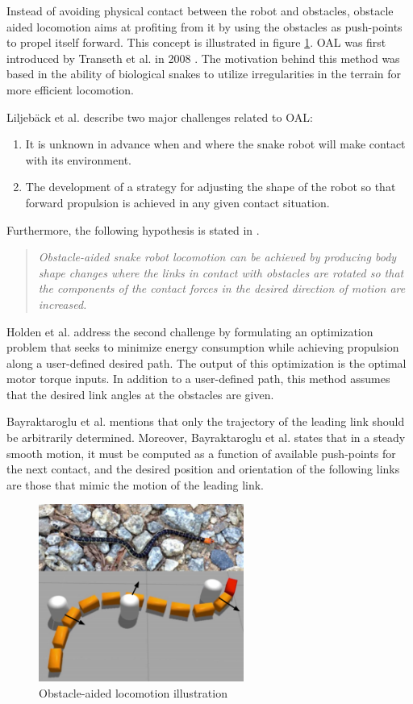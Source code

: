 Instead of avoiding physical contact between the robot and obstacles, obstacle aided locomotion aims at profiting from it by using the obstacles as push-points to propel itself forward. This concept is illustrated in figure \ref{fig:oal}. OAL was first introduced by Transeth et al. in 2008 \cite{transeth2008snake}. The motivation behind this method was based in the ability of biological snakes to utilize irregularities in the terrain for more efficient locomotion.

Liljebäck et al. \cite{liljeback2012snake} describe two major challenges related to OAL:
\begin{enumerate}
  \item It is unknown in advance when and where the snake robot will make contact with its environment.
  \item The development of a strategy for adjusting the shape of the robot so that forward propulsion is achieved in any given contact situation.
\end{enumerate}
Furthermore, the following hypothesis is stated in \cite{liljeback2012snake}.
\begin{quote}
   \textit{ Obstacle-aided snake robot locomotion can be achieved by producing body shape changes where the links in contact with obstacles are rotated so that the components of the contact forces in the desired direction of motion are increased.}
\end{quote}

Holden et al. \cite{holden2014optimal} address the second challenge by formulating an optimization problem that seeks to minimize energy consumption while achieving propulsion along a user-defined desired path. The output of this optimization is the optimal motor torque inputs. In addition to a user-defined path, this method assumes that the desired link angles at the obstacles are given.

Bayraktaroglu et al. \cite{bayraktaroglu2004understanding} mentions that only the trajectory of the leading link should be arbitrarily determined. Moreover, Bayraktaroglu et al. \cite{bayraktaroglu2004understanding} states that in a steady smooth motion, it must be computed as a function of available push-points for the next contact, and the desired position and orientation of the following links are those that mimic the motion of the leading link.

\begin{figure}
    \centering
    \includegraphics[width=0.6\textwidth]{figures/theory/oal.PNG}
    \caption{Obstacle-aided locomotion illustration \cite{sanfilippo2017snakesim}}
    \label{fig:oal}
\end{figure}